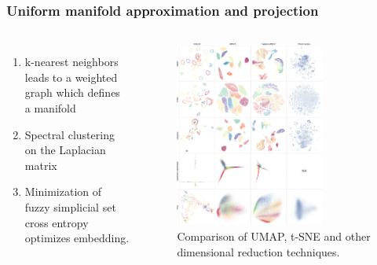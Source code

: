 \documentclass{beamer}
\begin{document}
\begin{frame}
  \frametitle{Uniform manifold approximation and projection}

  \begin{columns}

    \begin{enumerate}
      \item k-nearest neighbors leads to a weighted graph
      which defines a manifold
      \item Spectral clustering on the Laplacian matrix
      \item Minimization of fuzzy simplicial set cross entropy optimizes embedding.
    \end{enumerate}


    \begin{figure}
      \includegraphics[width=0.75\textwidth]{gfx/umap.png}
      \centering
      \caption{Comparison of UMAP, t-SNE and other dimensional reduction techniques.}
      \label{fig:dimredcompare}
    \end{figure}

  \end{columns}

\end{frame}
\end{document}
